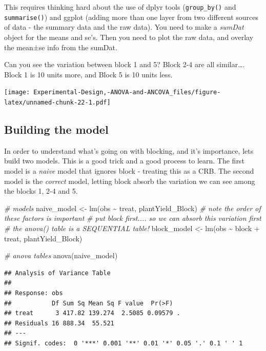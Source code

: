 \documentclass[
]{book}
\newenvironment{Shaded}{\begin{snugshade}}{\end{snugshade}}
\newcommand{\CommentTok}[1]{\textcolor[rgb]{0.56,0.35,0.01}{\textit{#1}}}
\newcommand{\FunctionTok}[1]{\textcolor[rgb]{0.00,0.00,0.00}{#1}}
\newcommand{\NormalTok}[1]{#1}
\newcommand{\OtherTok}[1]{\textcolor[rgb]{0.56,0.35,0.01}{#1}}
\newcommand{\SpecialCharTok}[1]{\textcolor[rgb]{0.00,0.00,0.00}{#1}}
\begin{document}
This requires thinking hard about the use of dplyr tools (\texttt{group\_by()} and \texttt{summarise()}) and ggplot (adding more than one layer from two different sources of data - the summary data and the raw data). You need to make a \emph{sumDat} object for the means and se's. Then you need to plot the raw data, and overlay the mean±se info from the sumDat.

Can you see the variation between block 1 and 5? Block 2-4 are all similar\ldots. Block 1 is 10 units more, and Block 5 is 10 units less.

\texttt{[image: Experimental-Design,-ANOVA-and-ANCOVA\_files/figure-latex/unnamed-chunk-22-1.pdf]}

\hypertarget{building-the-model}{%
\subsection{Building the model}\label{building-the-model}}

In order to understand what's going on with blocking, and it's importance, lets build two models. This is a good trick and a good process to learn. The first model is a \emph{naive} model that ignores block - treating this as a CRB. The second model is the \emph{correct} model, letting block absorb the variation we can see among the blocks 1, 2-4 and 5.

\begin{Shaded}
\begin{Highlighting}[]
\CommentTok{\# models}
\NormalTok{naive\_model }\OtherTok{\textless{}{-}} \FunctionTok{lm}\NormalTok{(obs }\SpecialCharTok{\textasciitilde{}}\NormalTok{ treat, plantYield\_Block)}
\CommentTok{\# note the order of these factors is important}
\CommentTok{\# put block first.... so we can absorb this variation first}
\CommentTok{\# the anova() table is a SEQUENTIAL table!}
\NormalTok{block\_model }\OtherTok{\textless{}{-}} \FunctionTok{lm}\NormalTok{(obs }\SpecialCharTok{\textasciitilde{}}\NormalTok{ block }\SpecialCharTok{+}\NormalTok{ treat, plantYield\_Block) }

\CommentTok{\# anova tables}
\FunctionTok{anova}\NormalTok{(naive\_model)}
\end{Highlighting}
\end{Shaded}

\begin{verbatim}
## Analysis of Variance Table
## 
## Response: obs
##           Df Sum Sq Mean Sq F value  Pr(>F)  
## treat      3 417.82 139.274  2.5085 0.09579 .
## Residuals 16 888.34  55.521                  
## ---
## Signif. codes:  0 '***' 0.001 '**' 0.01 '*' 0.05 '.' 0.1 ' ' 1
\end{verbatim}
\end{document}
